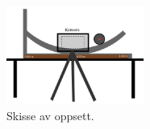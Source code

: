 \begin{figure}[h] 
    \begin{center}
        \includegraphics[width=0.4\textwidth]{img/skisse}
    \end{center}
    \caption{Skisse av oppsett.}
    \label{Fig Oppsett}
\end{figure}

